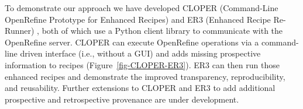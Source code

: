 \documentclass[runningheads]{llncs}
\begin{document}
To demonstrate our approach we have developed CLOPER (Command-Line OpenRefine Prototype for Enhanced
Recipes) and ER3 (Enhanced Recipe Re-Runner) \cite{ORtools2018}, both of which use a Python client
library \cite{makepeace18ORclient} to communicate with the OpenRefine server. CLOPER can execute
OpenRefine operations via a command-line driven interface (i.e., without a GUI) and adds missing
prospective information to recipes (Figure~\ref{fig-CLOPER-ER3}). ER3 can then run those enhanced
recipes and demonstrate the improved transparency, reproducibility, and reusability. Further
extensions to CLOPER and ER3 to add additional prospective and retrospective provenance are under
development.











\end{document}
